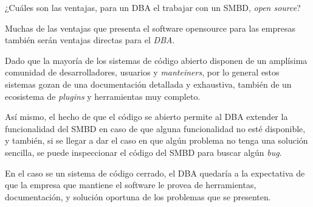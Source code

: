 \item ¿Cuáles son las ventajas, para un DBA el trabajar con un SMBD, \textit{open source}?

Muchas de las ventajas que presenta el software opensource para las empresas
también serán ventajas directas para el \textit{DBA}.

Dado que la mayoría de los sistemas de código abierto disponen de un amplísima comunidad de desarrolladores, usuarios y \textit{manteiners},
por lo general estos sistemas gozan de una documentación detallada y exhaustiva,
también de un ecosistema de \textit{plugins} y herramientas muy completo.

Así mismo, el hecho de que el código se abierto permite al DBA extender la funcionalidad del SMBD en caso de que alguna funcionalidad no esté disponible, y también, si se llegar a dar el caso en que algún problema no tenga una solución sencilla, se puede inspeccionar el código del SMBD para buscar algún \textit{bug}.

En el caso se un sistema de código cerrado, el DBA quedaría a la expectativa de que la empresa que mantiene el software le provea de herramientas, documentación, y solución oportuna de los problemas que se presenten.
